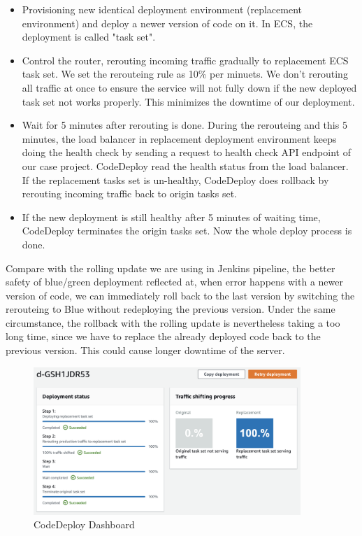 \begin{itemize}
 \item Provisioning new identical deployment environment (replacement environment) and deploy a newer version of code on it. In ECS, the deployment is called "task set".
 \item Control the router, rerouting incoming traffic gradually to replacement ECS task set. We set the rerouteing rule as 10\% per minuets. We don't rerouting all traffic at once to ensure the service will not fully down if the new deployed task set not works properly. This minimizes the downtime of our deployment.
 \item Wait for 5 minutes after rerouting is done. During the rerouteing and this 5 minutes, the load balancer in replacement deployment environment keeps doing the health check by sending a request to health check API endpoint of our case project. CodeDeploy read the health status from the load balancer. If the replacement tasks set is un-healthy, CodeDeploy does rollback by rerouting incoming traffic back to origin tasks set.
 \item If the new deployment is still healthy after 5 minutes of waiting time, CodeDeploy terminates the origin tasks set. Now the whole deploy process is done.
\end{itemize}
Compare with the rolling update we are using in Jenkins pipeline, the better safety of blue/green deployment reflected at, when error happens with a newer version of code, we can immediately roll back to the last version by switching the rerouteing to Blue \cite{UsingBlu65:online} without redeploying the previous version. Under the same circumstance, the rollback with the rolling update is nevertheless taking a too long time, since we have to replace the already deployed code back to the previous version. This could cause longer downtime of the server. 
\begin{figure}[h]
 \centering
 \includegraphics[width=0.90\textwidth]{pics/codedeploy_steps.png}
 \caption{CodeDeploy Dashboard}
 \label{fig:codedeploy_steps}
\end{figure}
